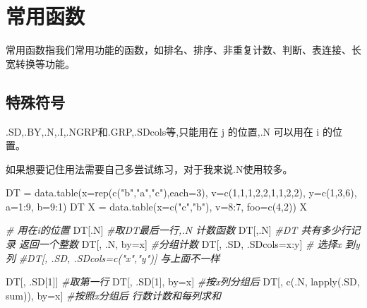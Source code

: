\documentclass[
]{book}
\newenvironment{Shaded}{\begin{snugshade}}{\end{snugshade}}
\newcommand{\AttributeTok}[1]{\textcolor[rgb]{0.77,0.63,0.00}{#1}}
\newcommand{\CommentTok}[1]{\textcolor[rgb]{0.56,0.35,0.01}{\textit{#1}}}
\newcommand{\DecValTok}[1]{\textcolor[rgb]{0.00,0.00,0.81}{#1}}
\newcommand{\FunctionTok}[1]{\textcolor[rgb]{0.00,0.00,0.00}{#1}}
\newcommand{\NormalTok}[1]{#1}
\newcommand{\OtherTok}[1]{\textcolor[rgb]{0.56,0.35,0.01}{#1}}
\newcommand{\SpecialCharTok}[1]{\textcolor[rgb]{0.00,0.00,0.00}{#1}}
\newcommand{\StringTok}[1]{\textcolor[rgb]{0.31,0.60,0.02}{#1}}
\begin{document}
\hypertarget{ux5e38ux7528ux51fdux6570-1}{%
\section{常用函数}\label{ux5e38ux7528ux51fdux6570-1}}

常用函数指我们常用功能的函数，如排名、排序、非重复计数、判断、表连接、长宽转换等功能。

\hypertarget{ux7279ux6b8aux7b26ux53f7}{%
\subsection{特殊符号}\label{ux7279ux6b8aux7b26ux53f7}}

.SD,.BY,.N,.I,.NGRP和.GRP,.SDcols等,只能用在 j 的位置,.N 可以用在 i 的位置。

如果想要记住用法需要自己多尝试练习，对于我来说.N使用较多。

\begin{Shaded}
\begin{Highlighting}[]
\NormalTok{DT }\OtherTok{=} \FunctionTok{data.table}\NormalTok{(}\AttributeTok{x=}\FunctionTok{rep}\NormalTok{(}\FunctionTok{c}\NormalTok{(}\StringTok{"b"}\NormalTok{,}\StringTok{"a"}\NormalTok{,}\StringTok{"c"}\NormalTok{),}\AttributeTok{each=}\DecValTok{3}\NormalTok{), }\AttributeTok{v=}\FunctionTok{c}\NormalTok{(}\DecValTok{1}\NormalTok{,}\DecValTok{1}\NormalTok{,}\DecValTok{1}\NormalTok{,}\DecValTok{2}\NormalTok{,}\DecValTok{2}\NormalTok{,}\DecValTok{1}\NormalTok{,}\DecValTok{1}\NormalTok{,}\DecValTok{2}\NormalTok{,}\DecValTok{2}\NormalTok{), }\AttributeTok{y=}\FunctionTok{c}\NormalTok{(}\DecValTok{1}\NormalTok{,}\DecValTok{3}\NormalTok{,}\DecValTok{6}\NormalTok{), }\AttributeTok{a=}\DecValTok{1}\SpecialCharTok{:}\DecValTok{9}\NormalTok{, }\AttributeTok{b=}\DecValTok{9}\SpecialCharTok{:}\DecValTok{1}\NormalTok{)}
\NormalTok{DT}
\NormalTok{X }\OtherTok{=} \FunctionTok{data.table}\NormalTok{(}\AttributeTok{x=}\FunctionTok{c}\NormalTok{(}\StringTok{"c"}\NormalTok{,}\StringTok{"b"}\NormalTok{), }\AttributeTok{v=}\DecValTok{8}\SpecialCharTok{:}\DecValTok{7}\NormalTok{, }\AttributeTok{foo=}\FunctionTok{c}\NormalTok{(}\DecValTok{4}\NormalTok{,}\DecValTok{2}\NormalTok{))}
\NormalTok{X}

\CommentTok{\# 用在i的位置}
\NormalTok{DT[.N] }\CommentTok{\#取DT最后一行,.N 计数函数}
\NormalTok{DT[,.N] }\CommentTok{\#DT 共有多少行记录 返回一个整数}
\NormalTok{DT[, .N, by}\OtherTok{=}\NormalTok{x]  }\CommentTok{\#分组计数}
\NormalTok{DT[, .SD, .SDcols}\OtherTok{=}\NormalTok{x}\SpecialCharTok{:}\NormalTok{y]  }\CommentTok{\# 选择x 到y 列}
\CommentTok{\#DT[, .SD, .SDcols=c("x","y")] 与上面不一样}

\NormalTok{DT[, .SD[}\DecValTok{1}\NormalTok{]] }\CommentTok{\#取第一行}
\NormalTok{DT[, .SD[}\DecValTok{1}\NormalTok{], by}\OtherTok{=}\NormalTok{x] }\CommentTok{\#按x列分组后}
\NormalTok{DT[, }\FunctionTok{c}\NormalTok{(.N, }\FunctionTok{lapply}\NormalTok{(.SD, sum)), by}\OtherTok{=}\NormalTok{x] }\CommentTok{\#按照x分组后 行数计数和每列求和}
\end{Highlighting}
\end{Shaded}
\end{document}
